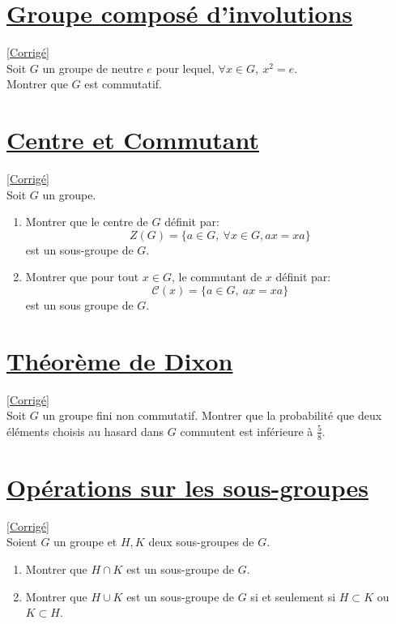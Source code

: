\documentclass[8pt]{book}
\begin{document}
	\section{\underline{Groupe composé d'involutions} }
	\label{Groupe composé d'involutions}
	\textcolor{blue}{\hyperref[Groupe composé d'involutions corrigé]{[Corrigé]}}\\
	Soit $G$ un groupe de neutre $e$ pour lequel, $\forall x\in G,\ x^2=e$. \\Montrer que $G$ est commutatif.
	
	\section{\underline{Centre et Commutant} }
	\label{Centre et Commutant}
	\label{Centre}
	\textcolor{blue}{\hyperref[Centre et Commutant corrigé]{[Corrigé]}}\\
	Soit $G$ un groupe.\\
	\begin{enumerate}[leftmargin=*]
		\item Montrer que le centre de $G$ définit par:\\
		$$Z(G)= \{a\in G,\ \forall x\in G,ax=xa\}$$
		est un sous-groupe de $G$.
		\item Montrer que pour tout $x \in G$, le commutant de $x$ définit par:
		$$\mathcal{C}(x)=\{a\in G,\ ax=xa\}$$
		est un sous groupe de $G$.
	\end{enumerate}
	
	\section{\underline{Théorème de Dixon} }
	\label{Probabilité que deux élémebts d'un groupe commutent}
	\textcolor{blue}{\hyperref[Probabilité que deux éléments d'un groupe commutent corrigé]{[Corrigé]}}\\
	Soit $G$ un groupe fini non commutatif. Montrer que la probabilité que deux éléments choisis au hasard dans $G$ commutent est inférieure à $\displaystyle\frac{5}{8}$.
	
	\section{\underline{Opérations sur les sous-groupes} }
	\label{Opérations sur les sous-groupes}
	\textcolor{blue}{\hyperref[Opérations sur les sous-groupes corrigé]{[Corrigé]}}\\
	Soient $G$ un groupe et $H,K$ deux sous-groupes de $G$.
	\begin{enumerate}[leftmargin=*]
		\item Montrer que $H\cap K$ est un sous-groupe de $G$.
		\item Montrer que $H\cup K$ est un sous-groupe de $G$ si et seulement si $H\subset K$ ou $K\subset H$.
	\end{enumerate}
	
\end{document}
